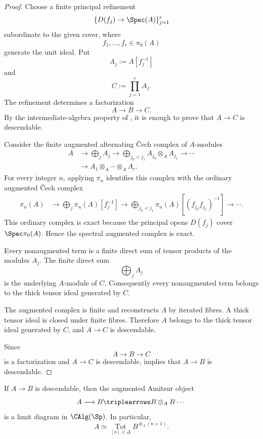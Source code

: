 \begin{proof}
Choose a finite principal refinement
\[
    \{D(f_j)\to\Spec(A)\}_{j=1}^r
\]
subordinate to the given cover, where
\[
    f_1,\ldots,f_r
    \in
    \pi_0(A)
\]
generate the unit ideal. Put
\[
    A_j
    :=
    A[f_j^{-1}]
\]
and
\[
    C
    :=
    \prod_{j=1}^rA_j.
\]
The refinement determines a factorization
\[
    A
    \longrightarrow
    B
    \longrightarrow
    C.
\]
By the intermediate-algebra property of
, it is enough to prove that
$A\to C$ is descendable.

Consider the finite augmented alternating \v{C}ech complex of $A$-modules
\[
\begin{aligned}
    A
    &\longrightarrow
    \bigoplus_jA_j
    \longrightarrow
    \bigoplus_{j_0<j_1}
    A_{j_0}\otimes_AA_{j_1}
    \longrightarrow
    \cdots
    \\
    &\longrightarrow
    A_1\otimes_A\cdots\otimes_AA_r.
\end{aligned}
\]
For every integer $n$, applying $\pi_n$ identifies this complex with the
ordinary augmented \v{C}ech complex
\[
\begin{aligned}
    \pi_n(A)
    &\longrightarrow
    \bigoplus_j\pi_n(A)[f_j^{-1}]
    \longrightarrow
    \bigoplus_{j_0<j_1}
    \pi_n(A)[(f_{j_0}f_{j_1})^{-1}]
    \longrightarrow
    \cdots.
\end{aligned}
\]
This ordinary complex is exact because the principal opens
$D(f_j)$ cover $\Spec\pi_0(A)$. Hence the spectral augmented complex is
exact.

Every nonaugmented term is a finite direct sum of tensor products of the
modules $A_j$. The finite direct sum
\[
    \bigoplus_jA_j
\]
is the underlying $A$-module of $C$. Consequently every nonaugmented term
belongs to the thick tensor ideal generated by $C$.

The augmented complex is finite and reconstructs $A$ by iterated fibres.
A thick tensor ideal is closed under finite fibres. Therefore $A$ belongs
to the thick tensor ideal generated by $C$, and $A\to C$ is descendable.

Since
\[
    A
    \longrightarrow
    B
    \longrightarrow
    C
\]
is a factorization and $A\to C$ is descendable,
 implies that $A\to B$ is
descendable.
\end{proof}

\begin{theorem}
\label{thm:spectral-amitsur-convergence}
If $A\to B$ is descendable, then the augmented Amitsur object
\[
    A
    \longrightarrow
    B
    \triplearrows
    B\otimes_A B
    \cdots
\]
is a limit diagram in $\CAlg(\Sp)$. In particular,
\[
    A
    \simeq
    \operatorname*{Tot}_{[n]\in\Delta}
    B^{\otimes_A(n+1)}.
\]
\end{theorem}

